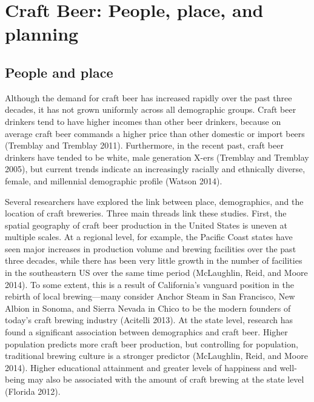 \documentclass[]{article}
\begin{document}
\section{Craft Beer: People, place, and
planning}\label{craft-beer-people-place-and-planning}

\subsection{People and place}\label{people-and-place}

Although the demand for craft beer has increased rapidly over the past
three decades, it has not grown uniformly across all demographic groups.
Craft beer drinkers tend to have higher incomes than other beer
drinkers, because on average craft beer commands a higher price than
other domestic or import beers (Tremblay and Tremblay 2011).
Furthermore, in the recent past, craft beer drinkers have tended to be
white, male generation X-ers (Tremblay and Tremblay 2005), but current
trends indicate an increasingly racially and ethnically diverse, female,
and millennial demographic profile (Watson 2014).

Several researchers have explored the link between place, demographics,
and the location of craft breweries. Three main threads link these
studies. First, the spatial geography of craft beer production in the
United States is uneven at multiple scales. At a regional level, for
example, the Pacific Coast states have seen major increases in
production volume and brewing facilities over the past three decades,
while there has been very little growth in the number of facilities in
the southeastern US over the same time period (McLaughlin, Reid, and
Moore 2014). To some extent, this is a result of California's vanguard
position in the rebirth of local brewing---many consider Anchor Steam in
San Francisco, New Albion in Sonoma, and Sierra Nevada in Chico to be
the modern founders of today's craft brewing industry (Acitelli 2013).
At the state level, research has found a significant association between
demographics and craft beer. Higher population predicts more craft beer
production, but controlling for population, traditional brewing culture
is a stronger predictor (McLaughlin, Reid, and Moore
201\protect\hypertarget{move422762242}{}{}4). Higher educational
attainment and greater levels of happiness and well-being may also be
associated with the amount of craft brewing at the state level (Florida
2012).
\end{document}
